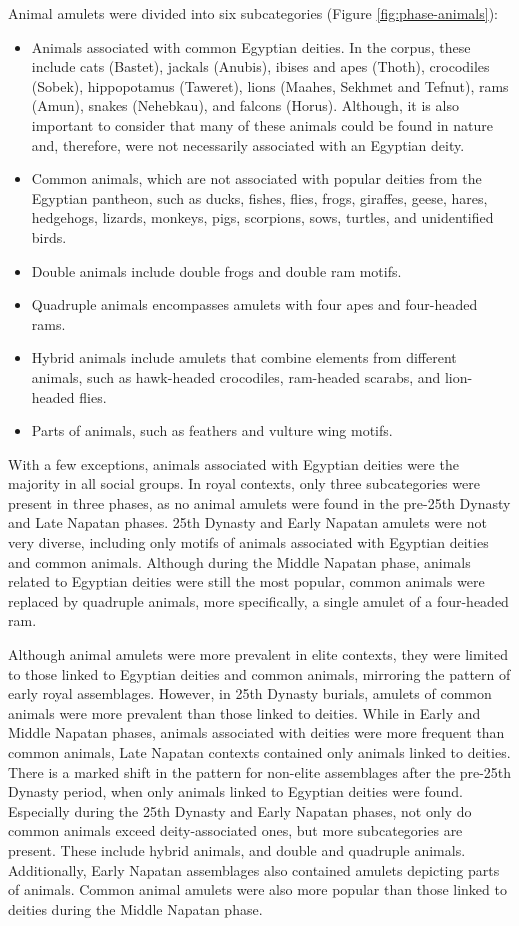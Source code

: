Animal amulets were divided into six subcategories (Figure \ref{fig:phase-animals}):

\begin{itemize}
	\item Animals associated with common Egyptian deities. In the corpus, these include cats (Bastet), jackals (Anubis), ibises and apes (Thoth), crocodiles (Sobek), hippopotamus (Taweret), lions (Maahes, Sekhmet and Tefnut), rams (Amun), snakes (Nehebkau), and falcons (Horus). Although, it is also important to consider that many of these animals could be found in nature and, therefore, were not necessarily associated with an Egyptian deity.
	\item Common animals, which are not associated with popular deities from the Egyptian pantheon, such as ducks, fishes, flies, frogs, giraffes, geese, hares, hedgehogs, lizards, monkeys, pigs, scorpions, sows, turtles, and unidentified birds.
	\item Double animals include double frogs and double ram motifs.
	\item Quadruple animals encompasses amulets with four apes and four-headed rams.
	\item Hybrid animals include amulets that combine elements from different animals, such as hawk-headed crocodiles, ram-headed scarabs, and lion-headed flies.
	\item Parts of animals, such as feathers and vulture wing motifs.
\end{itemize}


With a few exceptions, animals associated with Egyptian deities were the majority in all social groups. In royal contexts, only three subcategories were present in three phases, as no animal amulets were found in the pre-25th Dynasty and Late Napatan phases. 25th Dynasty and Early Napatan amulets were not very diverse, including only motifs of animals associated with Egyptian deities and common animals. Although during the Middle Napatan phase, animals related to Egyptian deities were still the most popular, common animals were replaced by quadruple animals, more specifically, a single amulet of a four-headed ram.


Although animal amulets were more prevalent in elite contexts, they were limited to those linked to Egyptian deities and common animals, mirroring the pattern of early royal assemblages. However, in 25th Dynasty burials, amulets of common animals were more prevalent than those linked to deities. While in Early and Middle Napatan phases, animals associated with deities were more frequent than common animals, Late Napatan contexts contained only animals linked to deities. There is a marked shift in the pattern for non-elite assemblages after the pre-25th Dynasty period, when only animals linked to Egyptian deities were found. Especially during the 25th Dynasty and Early Napatan phases, not only do common animals exceed deity-associated ones, but more subcategories are present. These include hybrid animals, and double and quadruple animals. Additionally, Early Napatan assemblages also contained amulets depicting parts of animals. Common animal amulets were also more popular than those linked to deities during the Middle Napatan phase.


